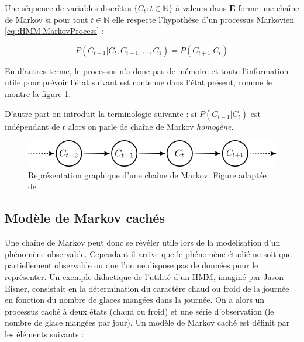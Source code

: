 \documentclass[12pt, french]{report}
\begin{document}

Une séquence de variables discrètes $\{ C_t : t \in \mathbb{N} \}$ à valeurs dans $\bm{E}$ forme une chaîne de Markov si pour tout $t \in \mathbb{N}$ elle respecte l'hypothèse d'un processus Markovien \eqref{eq::HMM:MarkovProcess} :

\begin{equation}
P\left( C_{t+1} | C_t,C_{t-1},...,C_1  \right) = P\left( C_{t+1} | C_t  \right)
\label{eq::HMM:MarkovProcess}
\end{equation}

En d'autres terme, le processus n'a donc pas de mémoire et toute l'information utile pour prévoir l'état suivant est contenue dans l'état présent, comme le montre la figure \ref{fig::HMM:MarkovChain}.

D'autre part on introduit la terminologie suivante : si $P\left( C_{t+1} | C_t  \right)$ est indépendant de $t$ alors on parle de chaîne de Markov \textit{homogène}.

\begin{figure}[ht]
	\begin{center}
		\includegraphics[width= 0.6 \textwidth]{Images/Models/HMM/ChaineMarkov.png}
		\caption{Représentation graphique d'une chaîne de Markov. Figure adaptée de \cite{zucchini_hidden_2017}.}
		\label{fig::HMM:MarkovChain}
	\end{center}
\end{figure}

\subsection{Modèle de Markov cachés}
\label{subsec:Modeles_HMM}
Une chaîne de Markov peut donc se révéler utile lors de la modélisation d'un phénomène observable. Cependant il arrive que le phénomène étudié ne soit que partiellement observable ou que l'on ne dispose pas de données pour le représenter. Un exemple didactique de l'utilité d'un HMM, imaginé par Jason Eisner, consistait en la détermination du caractère chaud ou froid de la journée en fonction du nombre de glaces mangées dans la journée. On a alors un processus caché à deux états (chaud ou froid) et une série d'observation (le nombre de glace mangées par jour). Un modèle de Markov caché est définit par les éléments suivants :
\end{document}
